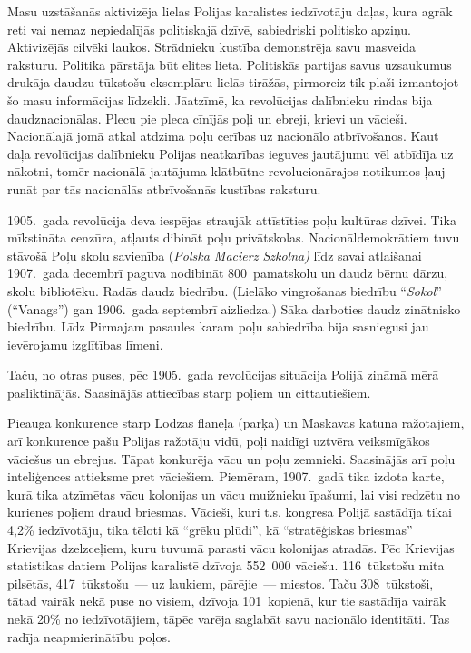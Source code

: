 \documentclass[twoside,a5paper,12pt,fleqn,openany]{extbook}
\newcommand{\pltxti}[1]{\textit{\textpolish{#1}}}
\begin{document}
Masu uzstāšanās aktivizēja lielas Polijas karalistes iedzīvotāju daļas, kura agrāk reti vai nemaz nepiedalījās politiskajā dzīvē, sabiedriski politisko apziņu. Aktivizējās cilvēki laukos. Strādnieku kustība demonstrēja savu masveida raksturu. Politika pārstāja būt elites lieta. Politiskās partijas savus uzsaukumus drukāja daudzu tūkstošu eksemplāru lielās tirāžās, pirmoreiz tik plaši izmantojot šo masu informācijas līdzekli. Jāatzīmē, ka revolūcijas dalībnieku rindas bija daudznacionālas. Plecu pie pleca cīnījās poļi un ebreji, krievi un vācieši. Nacionālajā jomā atkal atdzima poļu cerības uz nacionālo atbrīvošanos. Kaut daļa revolūcijas dalībnieku Polijas neatkarības ieguves jautājumu vēl atbīdīja uz nākotni, tomēr nacionālā jautājuma klātbūtne revolucionārajos notikumos ļauj runāt par tās nacionālās atbrīvošanās kustības raksturu.

1905.~gada revolūcija deva iespējas straujāk attīstīties poļu kultūras dzīvei. Tika mīkstināta cenzūra, atļauts dibināt poļu privātskolas. Nacionāldemokrātiem tuvu stāvošā Poļu skolu savienība (\pltxti{Polska Macierz Szkolna)} līdz savai atlaišanai 1907.~gada decembrī paguva nodibināt 800~pamatskolu un daudz bērnu dārzu, skolu bibliotēku. Radās daudz biedrību. (Lielāko vingrošanas biedrību ``\pltxti{Sokol}'' (``Vanags'') gan 1906.~gada septembrī aizliedza.) Sāka darboties daudz zinātnisko biedrību. Līdz Pirmajam pasaules karam poļu sabiedrība bija sasniegusi jau ievērojamu izglītības līmeni.

Taču, no otras puses, pēc 1905.~gada revolūcijas situācija Polijā zināmā mērā pasliktinājās. Saasinājās attiecības starp poļiem un cittautiešiem.

Pieauga konkurence starp Lodzas flaneļa (parķa) un Maskavas katūna ražotājiem, arī konkurence pašu Polijas ražotāju vidū, poļi naidīgi uztvēra veiksmīgākos vāciešus un ebrejus. Tāpat konkurēja vācu un poļu zemnieki. Saasinājās arī poļu inteliģences attieksme pret vāciešiem. Piemēram, 1907.~gadā tika izdota karte, kurā tika atzīmētas vācu kolonijas un vācu muižnieku īpašumi, lai visi redzētu no kurienes poļiem draud briesmas. Vācieši, kuri t.s. kongresa Polijā sastādīja tikai 4,2\% iedzīvotāju, tika tēloti kā ``grēku plūdi'', kā ``stratēģiskas briesmas'' Krievijas dzelzceļiem, kuru tuvumā parasti vācu kolonijas atradās. Pēc Krievijas statistikas datiem Polijas karalistē dzīvoja 552~000 vāciešu. 116~tūkstošu mita pilsētās, 417~tūkstošu~--- uz laukiem, pārējie~--- miestos. Taču 308~tūkstoši, tātad vairāk nekā puse no visiem, dzīvoja 101~kopienā, kur tie sastādīja vairāk nekā 20\% no iedzīvotājiem, tāpēc varēja saglabāt savu nacionālo identitāti. Tas radīja neapmierinātību poļos.
\end{document}
